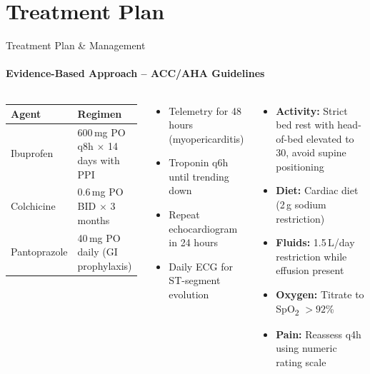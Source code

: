 \section{Treatment Plan}
\begin{frame}{Treatment Plan \& Management}
  \framesubtitle{Evidence-Based Approach -- ACC/AHA Guidelines}

  \begin{columns}[T]
    \begin{tcolorbox}[infobox,title={\faPrescriptionBottle\hspace{4pt}Pharmacologic Therapy}]
      \small
      \renewcommand{\arraystretch}{1.3}
      \begin{tabular}{@{}p{}p{}@{}}
        \toprule
        \textbf{Agent} & \textbf{Regimen} \\
        \midrule
        Ibuprofen & 600\,mg PO q8h $\times$ 14 days with PPI \\
        Colchicine & 0.6\,mg PO BID $\times$ 3 months \\
        Pantoprazole & 40\,mg PO daily (GI prophylaxis) \\
        \bottomrule
      \end{tabular}
    \end{tcolorbox}

    \vspace{0.2cm}

    \begin{tcolorbox}[highlightbox,title={\faCalendarCheck\hspace{4pt}Monitoring Protocol}]
      \small
      \begin{itemize}
        \item Telemetry for 48 hours (myopericarditis)
        \item Troponin q6h until trending down
        \item Repeat echocardiogram in 24 hours
        \item Daily ECG for ST-segment evolution
      \end{itemize}
    \end{tcolorbox}

    \begin{tcolorbox}[infobox,title={\faUserMd\hspace{4pt}Non-Pharmacologic}]
      \small
      \begin{itemize}
        \item \textbf{Activity:} Strict bed rest with head-of-bed elevated to 30\textdegree, avoid supine positioning
        \item \textbf{Diet:} Cardiac diet (2\,g sodium restriction)
        \item \textbf{Fluids:} 1.5\,L/day restriction while effusion present
        \item \textbf{Oxygen:} Titrate to SpO\textsubscript{2} $>92$\% 
        \item \textbf{Pain:} Reassess q4h using numeric rating scale
      \end{itemize}
    \end{tcolorbox}


\end{columns}
\end{frame}
